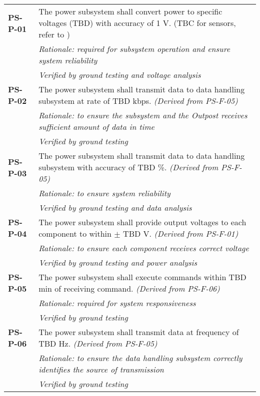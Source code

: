 \begin{longtable}{P{2cm}P{13.25cm}}
\textbf{PS-P-01}	& The power subsystem shall convert power to specific voltages (TBD) with accuracy of 1 \gls{V}. (\gls{TBC} for sensors, refer to )\\
& \textit{Rationale: required for subsystem operation and ensure system reliability} \\
& \textit{Verified by ground testing and voltage analysis}	\\

\textbf{PS-P-02}	& The power subsystem shall transmit data to data handling subsystem at rate of \gls{TBD} \gls{kbps}. \textit{(Derived from PS-F-05)} \\
 & \textit{Rationale: to ensure the subsystem and the Outpost receives sufficient amount of data in time} \\
 & \textit{Verified by ground testing}				\\
 
\textbf{PS-P-03}	& The power subsystem shall transmit data to data handling subsystem with accuracy of \gls{TBD} \%. \textit{(Derived from PS-F-05)} \\
 & \textit{Rationale: to ensure system reliability} \\
 & \textit{Verified by ground testing and data analysis}	\\
 
\textbf{PS-P-04}	& The power subsystem shall provide output voltages to each component to within $\pm$ \gls{TBD} \gls{V}. \textit{(Derived from PS-F-01)} \\
 & \textit{Rationale: to ensure each component receives correct voltage} \\
 & \textit{Verified by ground testing and power analysis}	\\
 
\textbf{PS-P-05}	& The power subsystem shall execute commands within \gls{TBD} \gls{min} of receiving command. \textit{(Derived from PS-F-06)} \\
 & \textit{Rationale: required for system responsiveness} \\
 & \textit{Verified by ground testing}	\\
 
\textbf{PS-P-06}	& The power subsystem shall transmit data at frequency of \gls{TBD} \gls{Hz}. \textit{(Derived from PS-F-05)} \\
 & \textit{Rationale: to ensure the data handling subsystem correctly identifies the source of transmission} \\
 & \textit{Verified by ground testing}	
\end{longtable}